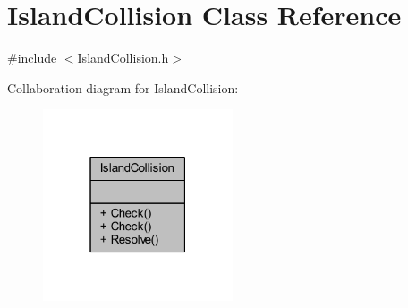 \hypertarget{class_island_collision}{}\section{Island\+Collision Class Reference}
\label{class_island_collision}


{\ttfamily \#include $<$Island\+Collision.\+h$>$}



Collaboration diagram for Island\+Collision\+:\nopagebreak
\begin{figure}[H]
\begin{center}
\leavevmode
\includegraphics[width=159pt]{class_island_collision__coll__graph}
\end{center}
\end{figure}
